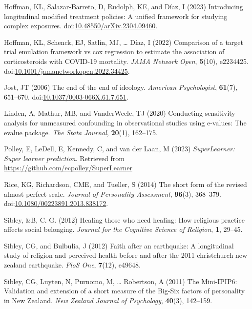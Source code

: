 \documentclass[
  singlecolumn]{article}
\newlength{\cslhangindent}
\newenvironment{CSLReferences}[2] %
 {\begin{list}{}{%
  \setlength{\itemindent}{0pt}
  \setlength{\leftmargin}{0pt}
  \setlength{\parsep}{0pt}
  \ifodd #1
   \setlength{\leftmargin}{\cslhangindent}
   \setlength{\itemindent}{-1\cslhangindent}
  \fi
  \setlength{\itemsep}{#2\baselineskip}}}
 {\end{list}}
\begin{document}
\begin{CSLReferences}{1}{0}
Hoffman, KL, Salazar-Barreto, D, Rudolph, KE, and Díaz, I (2023)
Introducing longitudinal modified treatment policies: A unified
framework for studying complex exposures.
doi:\href{https://doi.org/10.48550/arXiv.2304.09460}{10.48550/arXiv.2304.09460}.

Hoffman, KL, Schenck, EJ, Satlin, MJ, \ldots{} Díaz, I (2022) Comparison
of a target trial emulation framework vs cox regression to estimate the
association of corticosteroids with COVID-19 mortality. \emph{JAMA
Network Open}, \textbf{5}(10), e2234425.
doi:\href{https://doi.org/10.1001/jamanetworkopen.2022.34425}{10.1001/jamanetworkopen.2022.34425}.

Jost, JT (2006) The end of the end of ideology. \emph{American
Psychologist}, \textbf{61}(7), 651--670.
doi:\href{https://doi.org/10.1037/0003-066X.61.7.651}{10.1037/0003-066X.61.7.651}.

Linden, A, Mathur, MB, and VanderWeele, TJ (2020) Conducting sensitivity
analysis for unmeasured confounding in observational studies using
e-values: The evalue package. \emph{The Stata Journal}, \textbf{20}(1),
162--175.

Polley, E, LeDell, E, Kennedy, C, and van der Laan, M (2023)
\emph{SuperLearner: Super learner prediction}. Retrieved from
\url{https://github.com/ecpolley/SuperLearner}

Rice, KG, Richardson, CME, and Tueller, S (2014) The short form of the
revised almost perfect scale. \emph{Journal of Personality Assessment},
\textbf{96}(3), 368--379.
doi:\href{https://doi.org/10.1080/00223891.2013.838172}{10.1080/00223891.2013.838172}.

Sibley, \&B, C. G. (2012) Healing those who need healing: How religious
practice affects social belonging. \emph{Journal for the Cognitive
Science of Religion}, \textbf{1}, 29--45.

Sibley, CG, and Bulbulia, J (2012) Faith after an earthquake: A
longitudinal study of religion and perceived health before and after the
2011 christchurch new zealand earthquake. \emph{PloS One},
\textbf{7}(12), e49648.

Sibley, CG, Luyten, N, Purnomo, M, \ldots{} Robertson, A (2011) The
Mini-IPIP6: Validation and extension of a short measure of the Big-Six
factors of personality in New Zealand. \emph{New Zealand Journal of
Psychology}, \textbf{40}(3), 142--159.


\end{CSLReferences}
\end{document}
